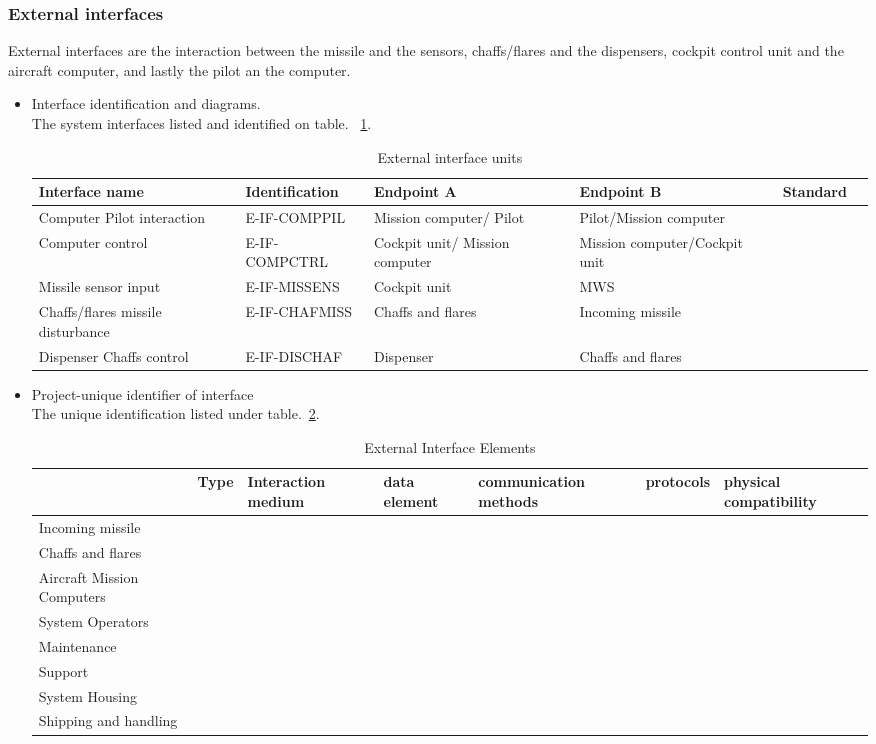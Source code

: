 \subsubsection{External interfaces}
External interfaces are the interaction between the missile and the sensors, chaffs/flares and the dispensers, cockpit control unit and the aircraft computer, and lastly the pilot an the computer.
\begin{itemize}
\item {Interface identification and diagrams.}\\
The system interfaces listed and identified on table. ~\ref{tab:External}.


\begin{center}
\begin{table}[h]
\caption{External interface units}
\label{tab:External}
\begin{tabular}{ | p{2cm} | l | p{2.3cm} | p{2.3cm} | l | p{1cm} |}
\hline
 \textbf{Interface name} & \textbf{Identification} & \textbf{Endpoint A} & \textbf{Endpoint B} & \textbf{Standard}\\ \hline
Computer Pilot interaction & E-IF-COMPPIL & Mission computer/ Pilot & Pilot/Mission computer & \\ \hline
 Computer control & E-IF-COMPCTRL & Cockpit unit/ Mission computer &Mission computer/Cockpit unit & \\ \hline
Missile sensor input & E-IF-MISSENS & Cockpit unit & MWS & \\ \hline
Chaffs/flares missile disturbance& E-IF-CHAFMISS & Chaffs and flares & Incoming missile & \\ \hline
Dispenser Chaffs control & E-IF-DISCHAF & Dispenser & Chaffs and flares & \\ \hline
\end{tabular}
\end{table}
\end{center}

\item {Project-unique identifier of interface}\\
The unique identification listed under table.~\ref{tab:External2}. 
\begin{table}
\caption{External Interface Elements}
\label{tab:External2}
\begin{tabular}{ l l l l l l l }
\hline
&Type&Interaction medium&data element&communication methods&protocols&physical compatibility\\
\hline
Incoming missile&&&&&&\\
\hline
Chaffs and flares&&&&&&\\
\hline
Aircraft Mission Computers&&&&&&\\
\hline
System Operators&&&&&&\\
\hline
Maintenance&&&&&&\\
\hline
Support&&&&&&\\
\hline
System Housing&&&&&&\\
\hline
Shipping and handling&&&&&&\\
\hline
\end{tabular}
\end{table}
\end{itemize}
